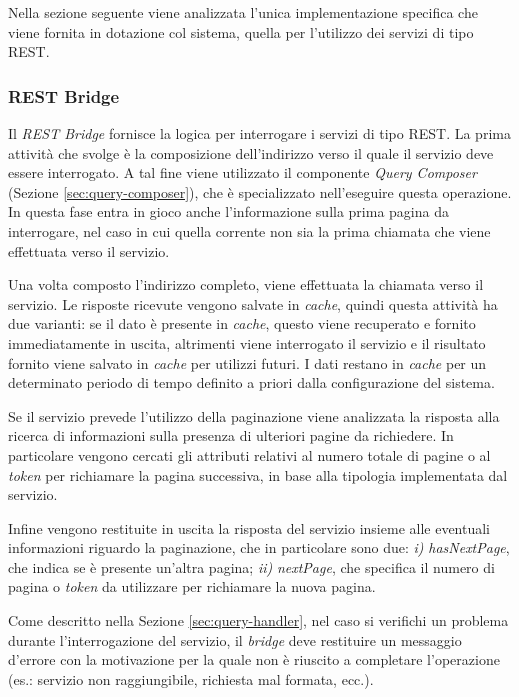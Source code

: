 Nella sezione seguente viene analizzata l'unica implementazione specifica che viene fornita in dotazione col sistema, quella per l'utilizzo dei servizi di tipo REST.

\subsubsection*{REST Bridge}

Il \emph{REST Bridge} fornisce la logica per interrogare i servizi di tipo REST. La prima attività che svolge è la composizione dell'indirizzo verso il quale il servizio deve essere interrogato. A tal fine viene utilizzato il componente \emph{Query Composer} (Sezione \ref{sec:query-composer}), che è specializzato nell'eseguire questa operazione. In questa fase entra in gioco anche l'informazione sulla prima pagina da interrogare, nel caso in cui quella corrente non sia la prima chiamata che viene effettuata verso il servizio.

Una volta composto l'indirizzo completo, viene effettuata la chiamata verso il servizio. Le risposte ricevute vengono salvate in \emph{cache}, quindi questa attività ha due varianti: se il dato è presente in \emph{cache}, questo viene recuperato e fornito immediatamente in uscita, altrimenti viene interrogato il servizio e il risultato fornito viene salvato in \emph{cache} per utilizzi futuri. I dati restano in \emph{cache} per un determinato periodo di tempo definito a priori dalla configurazione del sistema.

Se il servizio prevede l'utilizzo della paginazione viene analizzata la risposta alla ricerca di informazioni sulla presenza di ulteriori pagine da richiedere. In particolare vengono cercati gli attributi relativi al numero totale di pagine o al \emph{token} per richiamare la pagina successiva, in base alla tipologia implementata dal servizio.

Infine vengono restituite in uscita la risposta del servizio insieme alle eventuali informazioni riguardo la paginazione, che in particolare sono due: \emph{i)} \emph{hasNextPage}, che indica se è presente un'altra pagina; \emph{ii)} \emph{nextPage}, che specifica il numero di pagina o \emph{token} da utilizzare per richiamare la nuova pagina.

Come descritto nella Sezione \ref{sec:query-handler}, nel caso si verifichi un problema durante l'interrogazione del servizio, il \emph{bridge} deve restituire un messaggio d'errore con la motivazione per la quale non è riuscito a completare l'operazione (es.: servizio non raggiungibile, richiesta mal formata, ecc.).

